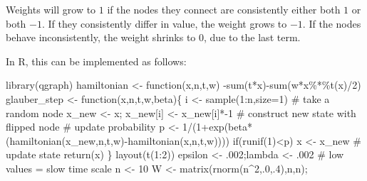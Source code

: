 \documentclass[
  a4paper,
  DIV=11,
  numbers=noendperiod,
  oneside]{scrreprt}
\newenvironment{Shaded}{}{}
\newcommand{\AttributeTok}[1]{\textcolor[rgb]{0.84,0.23,0.29}{#1}}
\newcommand{\CommentTok}[1]{\textcolor[rgb]{0.42,0.45,0.49}{#1}}
\newcommand{\ControlFlowTok}[1]{\textcolor[rgb]{0.84,0.23,0.29}{#1}}
\newcommand{\DecValTok}[1]{\textcolor[rgb]{0.00,0.36,0.77}{#1}}
\newcommand{\FunctionTok}[1]{\textcolor[rgb]{0.44,0.26,0.76}{#1}}
\newcommand{\NormalTok}[1]{\textcolor[rgb]{0.14,0.16,0.18}{#1}}
\newcommand{\OtherTok}[1]{\textcolor[rgb]{0.44,0.26,0.76}{#1}}
\newcommand{\SpecialCharTok}[1]{\textcolor[rgb]{0.00,0.36,0.77}{#1}}
\begin{document}
Weights will grow to \(1\) if the nodes they connect are consistently
either both \(1\) or both \(-1\). If they consistently differ in value,
the weight grows to \(-1\). If the nodes behave inconsistently, the
weight shrinks to \(0\), due to the last term.

In R, this can be implemented as follows:

\begin{Shaded}
\begin{Highlighting}[]
\FunctionTok{library}\NormalTok{(qgraph)}
\NormalTok{hamiltonian }\OtherTok{\textless{}{-}} \ControlFlowTok{function}\NormalTok{(x,n,t,w) }\SpecialCharTok{{-}}\FunctionTok{sum}\NormalTok{(t}\SpecialCharTok{*}\NormalTok{x)}\SpecialCharTok{{-}}\FunctionTok{sum}\NormalTok{(w}\SpecialCharTok{*}\NormalTok{x}\SpecialCharTok{\%*\%}\FunctionTok{t}\NormalTok{(x)}\SpecialCharTok{/}\DecValTok{2}\NormalTok{)}
\NormalTok{glauber\_step  }\OtherTok{\textless{}{-}}  \ControlFlowTok{function}\NormalTok{(x,n,t,w,beta)\{}
\NormalTok{  i }\OtherTok{\textless{}{-}} \FunctionTok{sample}\NormalTok{(}\DecValTok{1}\SpecialCharTok{:}\NormalTok{n,}\AttributeTok{size=}\DecValTok{1}\NormalTok{) }\CommentTok{\# take a random node}
\NormalTok{  x\_new }\OtherTok{\textless{}{-}}\NormalTok{ x; x\_new[i] }\OtherTok{\textless{}{-}}\NormalTok{ x\_new[i]}\SpecialCharTok{*{-}}\DecValTok{1} \CommentTok{\# construct new state with flipped node}
  \CommentTok{\# update probability}
\NormalTok{  p }\OtherTok{\textless{}{-}} \DecValTok{1}\SpecialCharTok{/}\NormalTok{(}\DecValTok{1}\SpecialCharTok{+}\FunctionTok{exp}\NormalTok{(beta}\SpecialCharTok{*}\NormalTok{(}\FunctionTok{hamiltonian}\NormalTok{(x\_new,n,t,w)}\SpecialCharTok{{-}}\FunctionTok{hamiltonian}\NormalTok{(x,n,t,w))))  }
  \ControlFlowTok{if}\NormalTok{(}\FunctionTok{runif}\NormalTok{(}\DecValTok{1}\NormalTok{)}\SpecialCharTok{\textless{}}\NormalTok{p) x }\OtherTok{\textless{}{-}}\NormalTok{ x\_new }\CommentTok{\# update state}
  \FunctionTok{return}\NormalTok{(x)}
\NormalTok{\}}
\FunctionTok{layout}\NormalTok{(}\FunctionTok{t}\NormalTok{(}\DecValTok{1}\SpecialCharTok{:}\DecValTok{2}\NormalTok{))}
\NormalTok{epsilon }\OtherTok{\textless{}{-}}\NormalTok{ .}\DecValTok{002}\NormalTok{;lambda }\OtherTok{\textless{}{-}}\NormalTok{ .}\DecValTok{002} \CommentTok{\# low values = slow time scale}
\NormalTok{n }\OtherTok{\textless{}{-}} \DecValTok{10}
\NormalTok{W }\OtherTok{\textless{}{-}} \FunctionTok{matrix}\NormalTok{(}\FunctionTok{rnorm}\NormalTok{(n}\SpecialCharTok{\^{}}\DecValTok{2}\NormalTok{,.}\DecValTok{0}\NormalTok{,.}\DecValTok{4}\NormalTok{),n,n); }

\end{Highlighting}
\end{Shaded}
\end{document}

